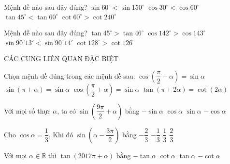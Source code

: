 \begin{ex}%
Mệnh đề nào sau đây đúng?
\choice
{$\sin 60^{\circ}<\sin 150^{\circ}$}
{$\cos 30^{\circ}<\cos 60^{\circ}$}
{\True $\tan 45^{\circ}<\tan 60^{\circ}$}
{$\cot 60^{\circ}>\cot 240^{\circ}$}
 \end{ex}

\begin{ex}%
Mệnh đề nào sau đây đúng?
\choice
{$\tan 45^\circ>\tan 46^\circ$}
{\True $\cos 142^\circ>\cos 143^\circ$}
{$\sin 90^\circ13'<\sin 90^\circ14'$}
{$\cot 128^\circ>\cot 126^\circ$}
\end{ex}

\begin{dang}
    { CÁC CUNG LIÊN QUAN ĐẶC BIỆT}
\end{dang}

\begin{ex}%
Chọn mệnh đề đúng trong các mệnh đề sau:
\choice
{\True $\cos \left({\dfrac{\pi}{2}-\alpha}\right)=\sin \alpha$}
{$\sin \left({\pi+\alpha}\right)=\sin \alpha$}
{$\cos \left({\dfrac{\pi}{2}+\alpha}\right)=\sin \alpha$}
{$\tan \left({\pi+2\alpha}\right)=\cot \left({2\alpha}\right)$}
\loigiai{
} 
\end{ex}

\begin{ex}%
Với mọi số thực $\alpha $, ta có $\sin \left({\dfrac{{9\pi}}{2}+\alpha}\right)$ bằng
\choice
{$-\sin \alpha$}
{\True $\cos \alpha$}
{$\sin \alpha$}
{$-\cos \alpha$}
\end{ex}

\begin{ex}%
Cho $\cos \alpha =\dfrac{1}{3}$. Khi đó $\sin \left({\alpha-\dfrac{{3\pi}}{2}}\right)$ bằng
\choice
{$-\dfrac{2}{3}$}
{$-\dfrac{1}{3}$}
{\True $\dfrac{1}{3}$}
{$\dfrac{2}{3}$}
\end{ex}

\begin{ex}%
Với mọi $\alpha \in \mathbb{R}$ thì $\tan \left({2017\pi+\alpha}\right)$ bằng 
\choice
{$-\tan \alpha$}
{$\cot \alpha$}
{\True $\tan \alpha$}
{$-\cot \alpha$}
\end{ex}

